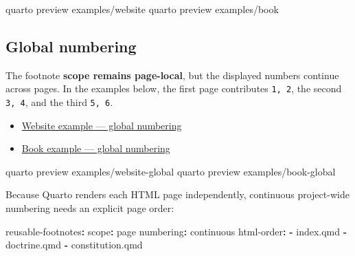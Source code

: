 \documentclass[
  letterpaper,
  DIV=11,
  numbers=noendperiod]{scrartcl}
\newenvironment{Shaded}{\begin{snugshade}}{\end{snugshade}}
\newcommand{\AttributeTok}[1]{\textcolor[rgb]{0.40,0.45,0.13}{#1}}
\newcommand{\ExtensionTok}[1]{\textcolor[rgb]{0.00,0.23,0.31}{#1}}
\newcommand{\FunctionTok}[1]{\textcolor[rgb]{0.28,0.35,0.67}{#1}}
\newcommand{\KeywordTok}[1]{\textcolor[rgb]{0.00,0.23,0.31}{\textbf{#1}}}
\newcommand{\NormalTok}[1]{\textcolor[rgb]{0.00,0.23,0.31}{#1}}
\providecommand{\tightlist}{%
  \setlength{\itemsep}{0pt}\setlength{\parskip}{0pt}}
\begin{document}
\begin{Shaded}
\begin{Highlighting}[]
\ExtensionTok{quarto}\NormalTok{ preview examples/website}
\ExtensionTok{quarto}\NormalTok{ preview examples/book}
\end{Highlighting}
\end{Shaded}

\subsection{Global numbering}\label{global-numbering}

The footnote \textbf{scope remains page-local}, but the displayed
numbers continue across pages. In the examples below, the first page
contributes \texttt{1,\ 2}, the second \texttt{3,\ 4}, and the third
\texttt{5,\ 6}.

\begin{itemize}
\tightlist
\item
  \href{https://github.com/lsbjordao/quarto-reusable-footnotes/tree/main/examples/website-global}{Website
  example --- global numbering}
\item
  \href{https://github.com/lsbjordao/quarto-reusable-footnotes/tree/main/examples/book-global}{Book
  example --- global numbering}
\end{itemize}

\begin{Shaded}
\begin{Highlighting}[]
\ExtensionTok{quarto}\NormalTok{ preview examples/website{-}global}
\ExtensionTok{quarto}\NormalTok{ preview examples/book{-}global}
\end{Highlighting}
\end{Shaded}

Because Quarto renders each HTML page independently, continuous
project-wide numbering needs an explicit page order:

\begin{Shaded}
\begin{Highlighting}[]
\FunctionTok{reusable{-}footnotes}\KeywordTok{:}
\AttributeTok{  }\FunctionTok{scope}\KeywordTok{:}\AttributeTok{ page}
\AttributeTok{  }\FunctionTok{numbering}\KeywordTok{:}\AttributeTok{ continuous}
\AttributeTok{  }\FunctionTok{html{-}order}\KeywordTok{:}
\AttributeTok{    }\KeywordTok{{-}}\AttributeTok{ index.qmd}
\AttributeTok{    }\KeywordTok{{-}}\AttributeTok{ doctrine.qmd}
\AttributeTok{    }\KeywordTok{{-}}\AttributeTok{ constitution.qmd}
\end{Highlighting}
\end{Shaded}
\end{document}
